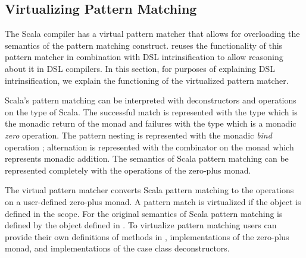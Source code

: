 \newcommand{\ttname}{\tau}


\newcommand{\ttarg}[1][]{\ttname_{\mathtt{arg}} \ifempty{#1}{}{(#1)}}
\newcommand{\ttother}[1][]{\ttname \ifempty{#1}{}{(#1)}}

\subsection{Virtualizing Pattern Matching}
\label{sec:virtpatmat}

The Scala compiler has a virtual pattern matcher that allows for overloading the semantics
 of the pattern matching construct. \yy reuses the functionality of this pattern matcher
 in combination with DSL intrinsification to allow reasoning about it in DSL compilers.
 In this section, for purposes of explaining DSL intrinsification, we explain the functioning
 of the virtualized pattern matcher.

Scala's pattern matching can be interpreted with deconstructors and operations on the 
 type of Scala. The successful match is represented with the  type which is
 the monadic return of the  monad and failures with the  type
 which is a monadic \emph{zero} operation. The pattern nesting is represented with
 the monadic \emph{bind} operation ; alternation is represented with the
  combinator on the  monad which represents monadic addition. The semantics
 of Scala pattern matching can be represented completely with the operations of the zero-plus monad.

The virtual pattern matcher converts Scala pattern matching to the operations on a user-defined zero-plus monad.
A pattern match is virtualized if the object  is defined in the scope. For the original
semantics of Scala pattern matching is defined by the object  defined in . To
virtualize pattern matching users can provide their own definitions of methods in ,
implementations of the zero-plus monad, and implementations of the case class deconstructors.

